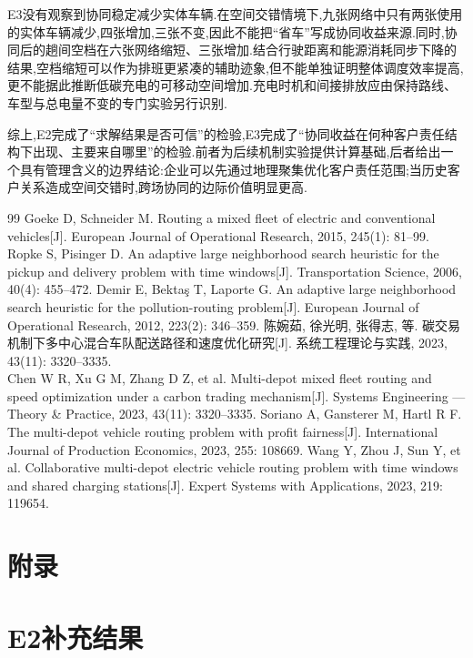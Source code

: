 \documentclass{../setp-new}
\begin{document}
E3没有观察到协同稳定减少实体车辆.在空间交错情境下,九张网络中只有两张使用的实体车辆减少,四张增加,三张不变,因此不能把“省车”写成协同收益来源.同时,协同后的趟间空档在六张网络缩短、三张增加.结合行驶距离和能源消耗同步下降的结果,空档缩短可以作为排班更紧凑的辅助迹象,但不能单独证明整体调度效率提高,更不能据此推断低碳充电的可移动空间增加.充电时机和间接排放应由保持路线、车型与总电量不变的专门实验另行识别.

综上,E2完成了“求解结果是否可信”的检验,E3完成了“协同收益在何种客户责任结构下出现、主要来自哪里”的检验.前者为后续机制实验提供计算基础,后者给出一个具有管理含义的边界结论:企业可以先通过地理聚集优化客户责任范围;当历史客户关系造成空间交错时,跨场协同的边际价值明显更高.

\begin{thebibliography}{99}
 Goeke D, Schneider M. Routing a mixed fleet of electric and conventional vehicles[J]. European Journal of Operational Research, 2015, 245(1): 81--99.
 Ropke S, Pisinger D. An adaptive large neighborhood search heuristic for the pickup and delivery problem with time windows[J]. Transportation Science, 2006, 40(4): 455--472.
 Demir E, Bektaş T, Laporte G. An adaptive large neighborhood search heuristic for the pollution-routing problem[J]. European Journal of Operational Research, 2012, 223(2): 346--359.
 陈婉茹, 徐光明, 张得志, 等. 碳交易机制下多中心混合车队配送路径和速度优化研究[J]. 系统工程理论与实践, 2023, 43(11): 3320--3335.\\ Chen W R, Xu G M, Zhang D Z, et al. Multi-depot mixed fleet routing and speed optimization under a carbon trading mechanism[J]. Systems Engineering --- Theory \& Practice, 2023, 43(11): 3320--3335.
 Soriano A, Gansterer M, Hartl R F. The multi-depot vehicle routing problem with profit fairness[J]. International Journal of Production Economics, 2023, 255: 108669.
 Wang Y, Zhou J, Sun Y, et al. Collaborative multi-depot electric vehicle routing problem with time windows and shared charging stations[J]. Expert Systems with Applications, 2023, 219: 119654.
\end{thebibliography}

\clearpage
\appendix
\section*{附录}
\setcounter{page}{1}

\section{E2补充结果}
\end{document}
